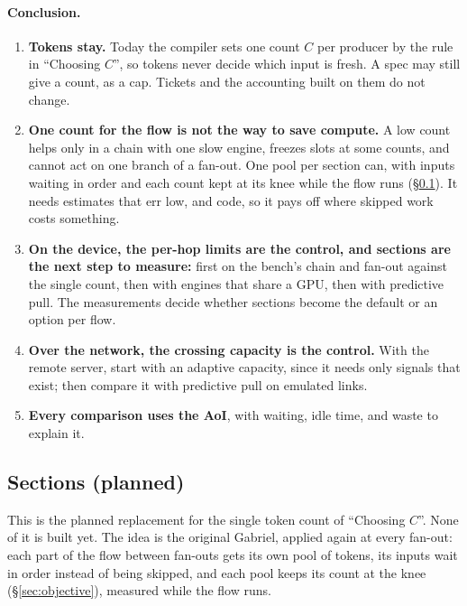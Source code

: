\documentclass[11pt]{article}
\begin{document}
\paragraph{Conclusion.}
\begin{enumerate}[nosep]
  \item \textbf{Tokens stay.} Today the compiler sets one count $C$
        per producer by the rule in ``Choosing $C$'', so tokens never decide
        which input is fresh. A spec may still give a count, as a cap.
        Tickets and the accounting built on them do not change.
  \item \textbf{One count for the flow is not the way to save compute.} A
        low count helps only in a chain with one slow engine, freezes slots
        at some counts, and cannot act on one branch of a fan-out. One pool
        per section can, with inputs waiting in order and each count kept at
        its knee while the flow runs (\S\ref{sec:sections}). It needs
        estimates that err low, and code, so it pays off where skipped work
        costs something.
  \item \textbf{On the device, the per-hop limits are the control, and
        sections are the next step to measure:} first on the bench's chain
        and fan-out against the single count, then with engines that share
        a GPU, then with predictive pull. The measurements decide whether
        sections become the default or an option per flow.
  \item \textbf{Over the network, the crossing capacity is the control.}
        With the remote server, start with an adaptive capacity, since it
        needs only signals that exist; then compare it with predictive pull
        on emulated links.
  \item \textbf{Every comparison uses the AoI}, with waiting, idle time, and
        waste to explain it.
\end{enumerate}

\subsection{Sections (planned)}
\label{sec:sections}

This is the planned replacement for the single token count of ``Choosing
$C$''. None of it is built yet. The idea is the original Gabriel, applied
again at every fan-out: each part of the flow between fan-outs gets its own
pool of tokens, its inputs wait in order instead of being skipped, and each
pool keeps its count at the knee (\S\ref{sec:objective}), measured while the
flow runs.
\end{document}
